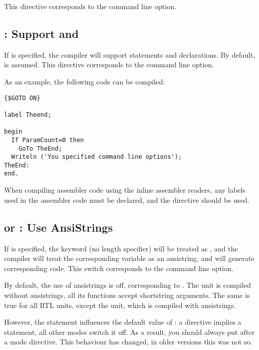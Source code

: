 This directive corresponds to the  command line option.

\subsection{ : Support  and }

If  is specified, the compiler will support 
statements and  declarations. By default,  is
assumed. This directive corresponds to the  command line option.

As an example, the following code can be compiled:
\begin{verbatim}
{$GOTO ON}

label Theend;

begin
  If ParamCount=0 then
    GoTo TheEnd;
  Writeln ('You specified command line options');
TheEnd:
end.
\end{verbatim}

\begin{remark}When compiling assembler code using the inline assembler
readers, any labels used in the assembler code must be declared, and 
the  directive should be used.
\end{remark}

\subsection{ or  : Use AnsiStrings}

If  is specified, the keyword  (no
length specifier) will be treated as , and the compiler
will treat the corresponding variable as an ansistring, and will
generate corresponding code. This switch corresponds to the 
command line option.

By default, the use of ansistrings is off, corresponding to .
The  unit is compiled without ansistrings, all its functions accept
shortstring arguments. The same is true for all RTL units, except the
 unit, which is compiled with ansistrings.

However, the  statement influences the default value of
: a  directive implies a
 statement, all other modes switch it off. As a result,
you should always put  after a mode directive. 
This behaviour has changed, in older \fpc versions this was not so. 

